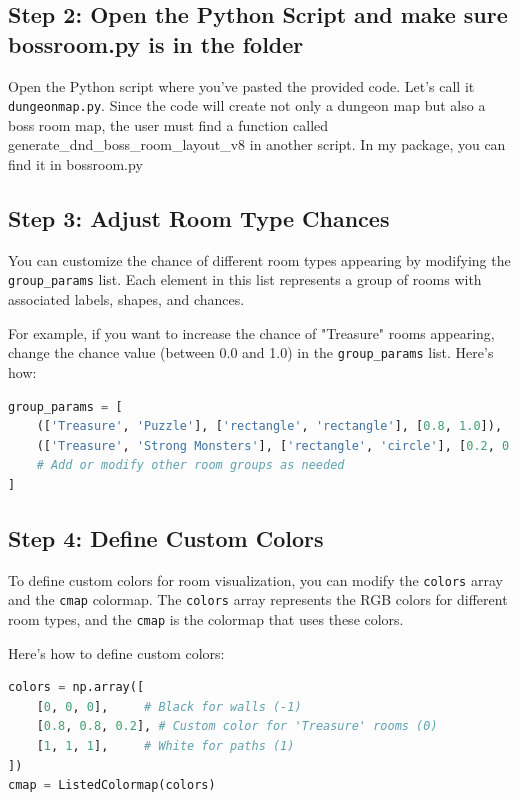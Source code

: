 \documentclass[10pt,twocolumn]{article}
\begin{document}
\subsection{Step 2: Open the Python Script and make sure bossroom.py is in the folder}

Open the Python script where you've pasted the provided code. Let's call it \texttt{dungeonmap.py}. Since the code will create not only a dungeon map but also a boss room map, the user must find a function called generate\_dnd\_boss\_room\_layout\_v8 in another script. In my package, you can find it in bossroom.py

\subsection{Step 3: Adjust Room Type Chances}

You can customize the chance of different room types appearing by modifying the \texttt{group\_params} list. Each element in this list represents a group of rooms with associated labels, shapes, and chances.

For example, if you want to increase the chance of "Treasure" rooms appearing, change the chance value (between 0.0 and 1.0) in the \texttt{group\_params} list. Here's how:

\begin{lstlisting}[language=Python]
group_params = [
    (['Treasure', 'Puzzle'], ['rectangle', 'rectangle'], [0.8, 1.0]),  # Increase chance for 'Treasure'
    (['Treasure', 'Strong Monsters'], ['rectangle', 'circle'], [0.2, 0.6]),
    # Add or modify other room groups as needed
]
\end{lstlisting}

\subsection{Step 4: Define Custom Colors}

To define custom colors for room visualization, you can modify the \texttt{colors} array and the \texttt{cmap} colormap. The \texttt{colors} array represents the RGB colors for different room types, and the \texttt{cmap} is the colormap that uses these colors.

Here's how to define custom colors:

\begin{lstlisting}[language=Python]
colors = np.array([
    [0, 0, 0],     # Black for walls (-1)
    [0.8, 0.8, 0.2], # Custom color for 'Treasure' rooms (0)
    [1, 1, 1],     # White for paths (1)
])
cmap = ListedColormap(colors)
\end{lstlisting}
\end{document}
